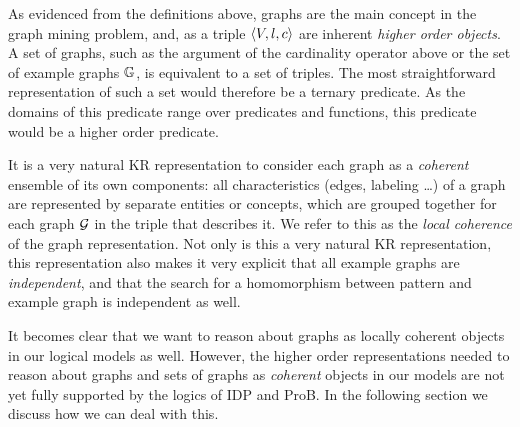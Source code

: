 As evidenced from the definitions above, graphs are the main concept in the graph mining problem, and, as a triple $\langle V,l,c \rangle$ are inherent \emph{higher order objects}.
A set of graphs, such as the argument of the cardinality operator above or the set of example graphs $\mathbb{G}$, is equivalent to a set of triples.
The most straightforward representation of such a set would therefore be a ternary predicate.
As the domains of this predicate range over predicates and functions, this predicate would be a higher order predicate.

It is a very natural KR representation to consider each graph as a \emph{coherent} ensemble of its own components: all characteristics (edges, labeling \ldots) of a graph are represented by separate entities or concepts, which are grouped together for each graph $\mathcal{G}$ in the triple that describes it. We refer to this as the \emph{local coherence} of the graph representation.
Not only is this a very natural KR representation, this representation also makes it very explicit that all example graphs are \emph{independent}, and that the search for a homomorphism between pattern and example graph is independent as well.

It becomes clear that we want to reason about graphs as locally coherent objects in our logical models as well.
However, the higher order representations needed to reason about graphs and sets of graphs as \emph{coherent} objects in our models are not yet fully supported by the logics of IDP and ProB.
In the following section we discuss how we can deal with this.




